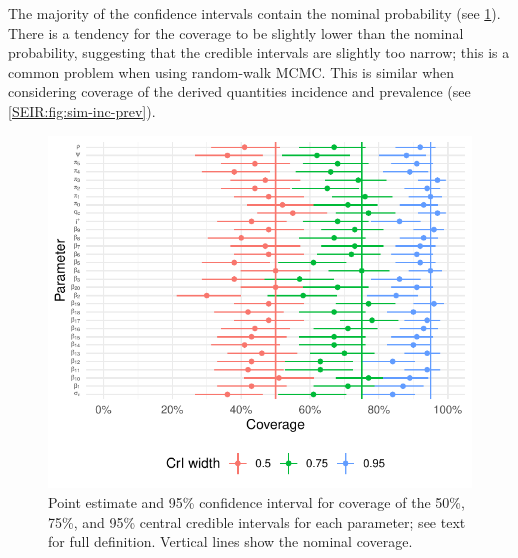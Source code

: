 \documentclass[thesis.tex]{subfiles}
\begin{document}
The majority of the confidence intervals contain the nominal probability (see \cref{SEIR:fig:sim-coverage}).
There is a tendency for the coverage to be slightly lower than the nominal probability, suggesting that the credible intervals are slightly too narrow; this is a common problem when using random-walk MCMC.
This is similar when considering coverage of the derived quantities incidence and prevalence (see \cref{SEIR:fig:sim-inc-prev}).
\begin{figure}
    \includegraphics{SEIR/sim/coverage}
    \caption[Coverage of simulation study]{%
        Point estimate and 95\% confidence interval for coverage of the 50\%, 75\%, and 95\% central credible intervals for each parameter; see text for full definition.
        Vertical lines show the nominal coverage.
    }
    \label{SEIR:fig:sim-coverage}
\end{figure}
\end{document}
